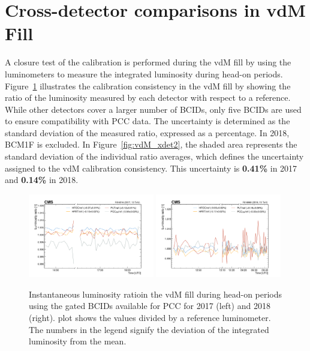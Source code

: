 \section{Cross-detector comparisons in vdM Fill}


A closure test of the calibration is performed during the vdM fill by using the luminometers to measure the integrated luminosity during head-on periods. Figure~\ref{fig:vdM_xdet} illustrates the calibration consistency in the vdM fill by showing the ratio of the luminosity measured by each detector with respect to a reference. While other detectors cover a larger number of BCIDs, only five BCIDs are used to ensure compatibility with PCC data. The uncertainty is determined as the standard deviation of the measured ratio, expressed as a percentage. In 2018, BCM1F is excluded. In Figure~\ref{fig:vdM_xdet2}, the shaded area represents the standard deviation of the individual ratio averages, which defines the uncertainty assigned to the vdM calibration consistency. This uncertainty is \textbf{0.41\%} in 2017 and \textbf{0.14\%} in 2018.

\begin{figure}[!h]
\centering
  \includegraphics[width=0.49\textwidth]{figures/vdMfitting/vdMconsistency/lumi_sum5_fill6016_HFOC-HFET-PLT-PCCHD5div_HFET+HFOC+PLT+PCCHD5_ratioTrue_nls10_Xsecleg317.pdf}
  \includegraphics[width=0.49\textwidth]{figures/vdMfitting/vdMconsistency/lumi_sum5_fill6868_HFOC-HFET-PLT-PCCHD5div_HFOC+HFET+PLT+PCCHD5_ratioTrue_nls2_Xsecleg318.pdf}
 \caption[Instantaneous Luminosity Ratio with PCC Gated BCIDs (2017 & 2018)]{Instantaneous luminosity ratioin the vdM fill during head-on periods using the gated BCIDs available for PCC for 2017 (left) and 2018 (right). plot shows the values divided by a reference luminometer. The numbers in the legend signify the deviation of the integrated luminosity from the mean.}
\label{fig:vdM_xdet}
\end{figure}



